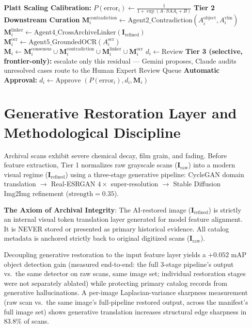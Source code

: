 \documentclass[12pt,a4paper]{report}
\begin{document}
\begin{algorithm}[!htbp]
\begin{algorithmic}[1]
\State \textbf{Platt Scaling Calibration:} $P(\text{error}_i) \leftarrow \frac{1}{1 + \exp(A \cdot SAA_i + B)}$
\State \textbf{Tier 2 Downstream Curation} 
\State \quad $\mathbf{M}_i^{\text{contradiction}} \leftarrow \text{Agent2\_Contradiction}(A_i^{\text{object}}, A_i^{\text{vlm}})$
\State \quad $\mathbf{M}_i^{\text{linker}} \leftarrow \text{Agent4\_CrossArchiveLinker}(\mathbf{I}_{\text{refined}})$
\State \quad $\mathbf{M}_i^{\text{ocr}} \leftarrow \text{Agent5\_GroundedOCR}(A_i^{\text{ocr}})$
\State $\mathbf{M}_i \leftarrow \mathbf{M}_i^{\text{consensus}} \cup \mathbf{M}_i^{\text{contradiction}} \cup \mathbf{M}_i^{\text{linker}} \cup \mathbf{M}_i^{\text{ocr}}$
    \State $d_i \leftarrow \text{Review}$
    \State \textbf{Tier 3 (selective, frontier-only):} escalate only this residual --- Gemini proposes, Claude audits
    \State \quad unresolved cases route to the Human Expert Review Queue
\Else
    \State \textbf{Automatic Approval:} $d_i \leftarrow \text{Approve}$
\EndIf
\State \Return $(P(\text{error}_i), d_i, \mathbf{M}_i)$
\end{algorithmic}
\end{algorithm}

\section{Generative Restoration Layer and Methodological Discipline}
Archival scans exhibit severe chemical decay, film grain, and fading. Before feature extraction, Tier 1 normalizes raw grayscale scans ($\mathbf{I}_{\text{raw}}$) into a modern visual regime ($\mathbf{I}_{\text{refined}}$) using a three-stage generative pipeline: CycleGAN domain translation \cite{cyclegan2017} $\rightarrow$ Real-ESRGAN $4\times$ super-resolution \cite{realesrgan2021} $\rightarrow$ Stable Diffusion Img2Img refinement \cite{stable_diffusion2022} ($\text{strength}=0.35$).

\begin{flushleft}
\textbf{The Axiom of Archival Integrity}: The AI-restored image ($\mathbf{I}_{\text{refined}}$) is strictly an internal visual token translation layer generated for model feature alignment. It is NEVER stored or presented as primary historical evidence. All catalog metadata is anchored strictly back to original digitized scans ($\mathbf{I}_{\text{raw}}$).
\end{flushleft}

Decoupling generative restoration to the input feature layer yields a $+0.052$ mAP object detection gain (measured end-to-end: the full 3-stage pipeline's output vs.\ the same detector on raw scans, same image set; individual restoration stages were not separately ablated) while protecting primary catalog records from generative hallucinations. A per-image Laplacian-variance sharpness measurement (raw scan vs.\ the same image's full-pipeline restored output, across the manifest's full image set) shows generative translation increases structural edge sharpness in $83.8\%$ of scans.
\end{document}
